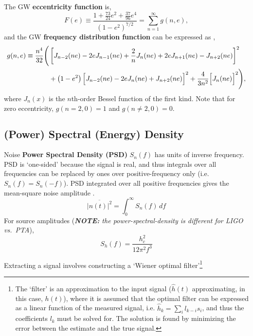 \documentclass[10pt, oneside, onecolumn]{article}   	%
\begin{document}
            The GW \textbf{eccentricity function} is,
            \begin{equation}
                \label{eq:}
                F(e) \equiv \frac{1 + \frac{73}{24} e^2 + \frac{37}{96} e^4}{\left( 1 - e^2\right)^{7/2}} = \sum_{n=1}^\infty g(n,e),
            \end{equation}
            and the GW \textbf{frequency distribution function} can be expressed as \citep[][Eq.~2.4]{enoki2007a},
            \begin{equation}
            \begin{split}
                \label{eq:freq_dist_func}
                g(n,e) \equiv \frac{n^4}{32} \Biggl(& \left[ J_{n-2}(ne) - 2eJ_{n-1}(ne) + \frac{2}{n} J_n (ne) + 2e J_{n+1} (ne) - J_{n+2} (ne) \vphantom{\frac{2}{n}}\right]^2 \\
                &+ \left(1-e^2\right) \Bigl[J_{n-2}(ne) - 2eJ_n(ne) + J_{n+2}(ne)\Bigr]^2 + \frac{4}{3n^2}\Bigl[J_n(ne)\Bigr]^2 \Biggr),
            \end{split}
            \end{equation}
            where $J_n(x)$ is the $n$th-order Bessel function of the first kind.  Note that for zero eccentricity, $g(n=2,0) = 1$ and $g(n\neq2, 0) = 0$.

        \subsection{(Power) Spectral (Energy) Density }
            Noise \textbf{Power Spectral Density (PSD)} $S_n(f)$ has units of inverse frequency.  PSD is `one-sided' because the signal is real, and thus integrals over all frequencies can be replaced by ones over positive-frequency only (i.e.~$S_n(f) = S_n(-f)$).  PSD integrated over all positive frequencies gives the mean-square noise amplitude \citep{moore2015}.
            \begin{equation}
            \overline{|n(t)|^2} = \int_0^\infty S_n(f) \, df
            \end{equation}
            For source amplitudes \citep{rosado2015} (\textit{\textbf{NOTE:} the power-spectral-density is different for LIGO vs.~PTA}),
            \begin{equation}
            S_h(f) = \frac{h_c^2}{12 \pi^2 f^3}
            \end{equation}

            Extracting a signal involves constructing a `Wiener optimal filter'\footnote{The `filter' is an approximation to the input signal ($\hat{h}(t)$ approximating, in this case, $h(t)$), where it is assumed that the optimal filter can be expressed as a linear function of the measured signal, i.e. $\hat{h}_k = \sum_i l_{k-i} s_i$, and thus the coefficients $l_k$ must be solved for.  The solution is found by minimizing the error between the estimate and the true signal.}
\end{document}
